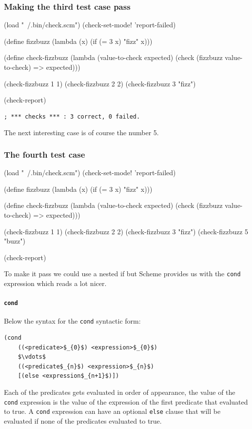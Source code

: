 \documentclass[12pt,a4paper,english,twoside]{article}
\begin{document}
\subsubsection{Making the third test case pass}
\begin{schemecode}
(load "~/.bin/check.scm")
(check-set-mode! 'report-failed)

(define fizzbuzz 
  (lambda (x) 
    (if (= 3 x) "fizz" x)))

(define check-fizzbuzz 
  (lambda (value-to-check expected)
    (check (fizzbuzz value-to-check) => expected)))

(check-fizzbuzz 1 1)
(check-fizzbuzz 2 2)
(check-fizzbuzz 3 "fizz")

(check-report)
\end{schemecode}
\begin{lstlisting}
; *** checks *** : 3 correct, 0 failed.
\end{lstlisting}
The next interesting case is of course the number 5.  
\subsubsection{The fourth test case}
\begin{schemecode}
(load "~/.bin/check.scm")
(check-set-mode! 'report-failed)

(define fizzbuzz 
  (lambda (x) 
    (if (= 3 x) "fizz" x)))

(define check-fizzbuzz 
  (lambda (value-to-check expected)
    (check (fizzbuzz value-to-check) => expected)))

(check-fizzbuzz 1 1)
(check-fizzbuzz 2 2)
(check-fizzbuzz 3 "fizz")
(check-fizzbuzz 5 "buzz")

(check-report)
\end{schemecode}
To make it pass we could use a nested if but Scheme provides us with the 
\texttt{cond} expression which reads a lot nicer.
\paragraph{\texttt{cond}}
Below the syntax for the \texttt{cond} syntactic form:
\begin{lstlisting}[mathescape]
  (cond 
    ((<predicate>$_{0}$) <expression>$_{0}$)
    $\vdots$ 
    ((<predicate$_{n}$) <expression>$_{n}$)
    [(else <expression$_{n+1}$)])
\end{lstlisting}
Each of the predicates gets evaluated in order of appearance, the value of the 
\texttt{cond} expression is the value of the expression of the first predicate 
that evaluated to true. A \texttt{cond} expression can have an optional 
\texttt{else} clause that will be evaluated if none of the predicates 
evaluated to true.
\end{document}
